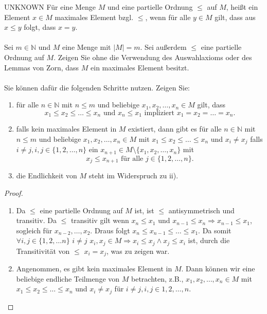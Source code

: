 \documentclass{problemset}
\begin{document}
\begin{problem}{UNKNOWN}
Für eine Menge $M$ und eine partielle Ordnung $\leq$ auf $M$, heißt ein Element $x \in M$ maximales Element bzgl. $\leq$, wenn für alle $y \in M$ gilt, dass aus $x \leq y$ folgt, dass $x = y$.
\\\\
Sei $m \in \mathbb{N}$ und $M$ eine Menge mit $|M| = m$. Sei außerdem $\leq$ eine partielle Ordnung auf $M$. Zeigen Sie ohne die Verwendung des Auswahlaxioms oder des Lemmas von Zorn, dass $M$ ein maximales Element besitzt.
\\\\
Sie können dafür die folgenden Schritte nutzen. Zeigen Sie:
\begin{enumerate}[label=\roman*)]
    \item
          für alle $n \in \mathbb{N}$ mit $n \leq m$ und beliebige $x_1, x_2, \ldots, x_n \in M$ gilt, dass \[
              x_1 \leq x_2 \leq \ldots \leq x_n \text{ und }x_n \leq x_1 \text{ impliziert } x_1 = x_2 = \ldots = x_n.
          \]
    \item
          falls kein maximales Element in $M$ existiert, dann gibt es für alle $n \in \mathbb{N}$ mit $n \leq m$ und beliebige $x_1, x_2, \ldots, x_n \in M$ mit $x_1 \leq x_2 \leq \ldots \leq x_n$ und $x_i \neq x_j$ falls $i \neq j,
              i, j \in \{1, 2, \ldots, n\}$ ein $x_{n+1} \in M \setminus \{x_1, x_2, \ldots, x_n\}$ mit \[
              x_j \leq x_{n+1} \text{ für alle } j \in \{1, 2, \ldots, n\}.
          \]
    \item
          die Endlichkeit von $M$ steht im Widerspruch zu ii).
\end{enumerate}
\begin{proof}
    \leavevmode
    \begin{enumerate}[label=\roman*)]
        \item
              Da $\le$ eine partielle Ordnung auf $M$ ist, ist $\le$ antisymmetrisch und transitiv.
              Da $\le$ transitiv gilt wenn $x_n \le x_1$ und $x_{n-1} \le x_n \Rightarrow x_{n-1} \le x_1$, sogleich für $x_{n-2}, \dots, x_2$.
              Draus folgt $x_n \leq x_{n-1} \le \dots \le x_1$.
              Da somit $\forall i,j \in \{1,2,\dots n\}$ $i \ne j$ $x_i,x_j \in M \Rightarrow x_i \le x_j \land x_j \le x_i$ ist,
              durch die Transitivität von $\le$ $x_i = x_j$, was zu zeigen war.
              \checkmark
        \item
              Angenommen, es gibt kein maximales Element in $M$. Dann können wir eine beliebige endliche Teilmenge von $M$ betrachten, z.B., $x_1, x_2, \ldots, x_n \in M$ mit $x_1 \leq x_2 \leq \ldots \leq x_n$ und $x_i \neq x_j$ für $i \neq j, i, j \in {1, 2, \ldots, n}$.

\end{enumerate}
\end{proof}
\end{problem}
\end{document}
